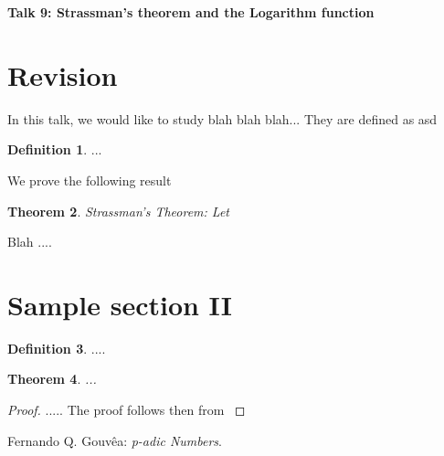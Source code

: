 \documentclass{article}
\theoremstyle{plain}
\newtheorem{thm}{Theorem}[section]
\theoremstyle{definition}
\newtheorem{defi}[thm]{Definition}
\begin{document}
\pagestyle{fancy}
\renewcommand{\footrulewidth}{0.4pt}
\fancyhead{}
\fancyfoot{}

\begin{center}
	\Huge{\textbf{Talk 9: Strassman's theorem and the Logarithm function}}%
\end{center}
	\begin{minipage}{0.45\textwidth}%
	\section{Revision}%
			In this talk, we would like to study blah blah blah... They are defined as asd
			\begin{defi}%
			  ...
			\end{defi}
		We prove the following result
		\begin{thm}%
		  Strassman's Theorem: \newline
		  Let
		\end{thm}
		
		
		
				
	\end{minipage}%
	\hfill
	\begin{minipage}{0.45\textwidth}
		Blah ....
\section{Sample section II}

\begin{defi}
	....
\end{defi}		

\begin{thm}
	 ...
\end{thm}

\begin{proof}
..... The proof follows then from \cite[Prop. 3.13]{Gou} %
\end{proof}
	\end{minipage}%



\begin{thebibliography}{widest-label} %
	
	Fernando Q. Gouv\^{e}a:
	\emph{p-adic Numbers}.
	
	
\end{thebibliography}
\end{document}
